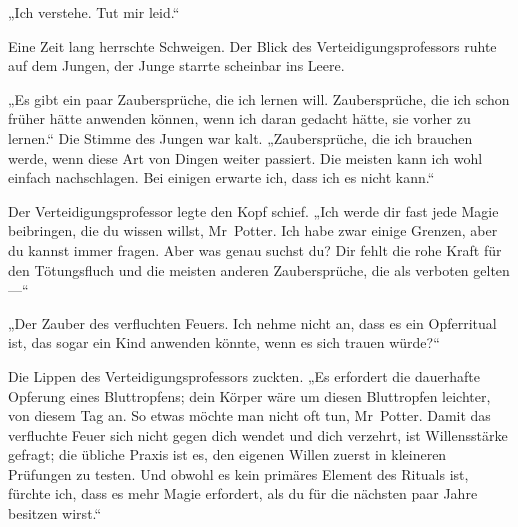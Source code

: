 „Ich verstehe. Tut mir leid.“

Eine Zeit lang herrschte Schweigen. Der Blick des Verteidigungsprofessors ruhte auf dem Jungen, der Junge starrte scheinbar ins Leere.

„Es gibt ein paar Zaubersprüche, die ich lernen will. Zaubersprüche, die ich schon früher hätte anwenden können, wenn ich daran gedacht hätte, sie vorher zu lernen.“ Die Stimme des Jungen war kalt. „Zaubersprüche, die ich brauchen werde, wenn diese Art von Dingen weiter passiert. Die meisten kann ich wohl einfach nachschlagen. Bei einigen erwarte ich, dass ich es nicht kann.“

Der Verteidigungsprofessor legte den Kopf schief.
„Ich werde dir fast jede Magie beibringen, die du wissen willst, Mr~Potter. Ich habe zwar einige Grenzen, aber du kannst immer fragen. Aber was genau suchst du? Dir fehlt die rohe Kraft für den Tötungsfluch und die meisten anderen Zaubersprüche, die als verboten gelten—“

„Der Zauber des verfluchten Feuers. Ich nehme nicht an, dass es ein Opferritual ist, das sogar ein Kind anwenden könnte, wenn es sich trauen würde?“

Die Lippen des Verteidigungsprofessors zuckten.
„Es erfordert die dauerhafte Opferung eines Bluttropfens; dein Körper wäre um diesen Bluttropfen leichter, von diesem Tag an. So etwas möchte man nicht oft tun, Mr~Potter. Damit das verfluchte Feuer sich nicht gegen dich wendet und dich verzehrt, ist Willensstärke gefragt; die übliche Praxis ist es, den eigenen Willen zuerst in kleineren Prüfungen zu testen. Und obwohl es kein primäres Element des Rituals ist, fürchte ich, dass es mehr Magie erfordert, als du für die nächsten paar Jahre besitzen wirst.“


